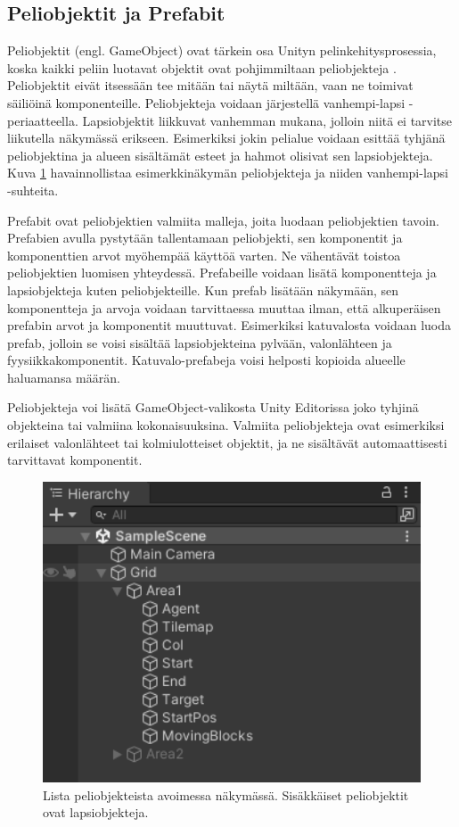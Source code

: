 \documentclass[utf8]{gradu3}
\begin{document}
\subsection{Peliobjektit ja Prefabit}

Peliobjektit (engl. GameObject) ovat tärkein osa Unityn pelinkehitysprosessia, koska kaikki peliin luotavat objektit ovat pohjimmiltaan peliobjekteja \parencite{unitydocgameobj}. Peliobjektit eivät itsessään tee mitään tai näytä miltään, vaan ne toimivat säiliöinä komponenteille. Peliobjekteja voidaan järjestellä vanhempi-lapsi -periaatteella. Lapsiobjektit liikkuvat vanhemman mukana, jolloin niitä ei tarvitse liikutella näkymässä erikseen. Esimerkiksi jokin pelialue voidaan esittää tyhjänä peliobjektina ja alueen sisältämät esteet ja hahmot olisivat sen lapsiobjekteja. Kuva \ref{peliobjektikuva} havainnollistaa esimerkkinäkymän peliobjekteja ja niiden vanhempi-lapsi -suhteita.

Prefabit ovat peliobjektien valmiita malleja, joita luodaan peliobjektien tavoin. Prefabien avulla pystytään tallentamaan peliobjekti, sen komponentit ja komponenttien arvot myöhempää käyttöä varten. Ne vähentävät toistoa peliobjektien luomisen yhteydessä. Prefabeille voidaan lisätä komponentteja ja lapsiobjekteja kuten peliobjekteille. Kun prefab lisätään näkymään, sen komponentteja ja arvoja voidaan tarvittaessa muuttaa ilman, että alkuperäisen prefabin arvot ja komponentit muuttuvat. Esimerkiksi katuvalosta voidaan luoda prefab, jolloin se voisi sisältää lapsiobjekteina pylvään, valonlähteen ja fyysiikkakomponentit. Katuvalo-prefabeja voisi helposti kopioida alueelle haluamansa määrän.

Peliobjekteja voi lisätä GameObject-valikosta Unity Editorissa joko tyhjinä objekteina tai valmiina kokonaisuuksina. Valmiita peliobjekteja ovat esimerkiksi erilaiset valonlähteet tai kolmiulotteiset objektit, ja ne sisältävät automaattisesti tarvittavat komponentit.

\begin{figure}[h]
\centering
\includegraphics[width=12cm]{peliobjektilistaus.png}
\caption{Lista peliobjekteista avoimessa näkymässä. Sisäkkäiset peliobjektit ovat lapsiobjekteja.}
\label{peliobjektikuva}
\end{figure}
\end{document}
